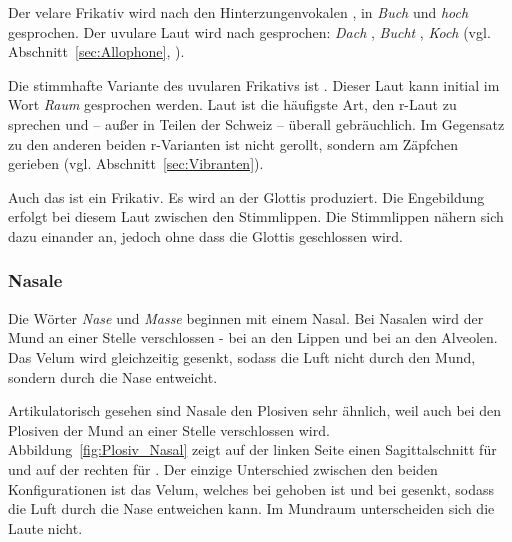 Der velare Frikativ \textipa{[x]} wird nach den Hinterzungenvokalen \textipa{[u, o]}, \zB in \textit{Buch} \textipa{[bu:x]} und \textit{hoch} \textipa{[ho:x]} gesprochen. Der uvulare Laut \textipa{[X]} wird nach \textipa{[a, U, O]} gesprochen: \textit{Dach} \textipa{[daX]}, \textit{Bucht} \textipa{[bUXt]}, \textit{Koch}  (vgl. Abschnitt~\ref{sec:Allophone}, \cite[202]{Pompino-Marschall2020}).

Die stimmhafte Variante des uvularen Frikativs \textipa{[X]} ist \textipa{[K]}. Dieser Laut kann initial im Wort \textit{Raum} \textipa{[K\t*{aU}m]} gesprochen werden. Laut \citet[52]{DudenAussprache2023} ist \textipa{[K]} die häufigste Art, den r-Laut zu sprechen und -- außer in Teilen der Schweiz -- überall gebräuchlich. Im Gegensatz zu den anderen beiden r-Varianten ist \textipa{[K]} nicht gerollt, sondern am Zäpfchen gerieben (vgl. Abschnitt~\ref{sec:Vibranten}).

Auch das \textipa{[h]} ist ein Frikativ. Es wird an der Glottis produziert. Die Engebildung erfolgt bei diesem Laut zwischen den Stimmlippen. Die Stimmlippen nähern sich dazu einander an, jedoch ohne dass die Glottis geschlossen wird.




\subsubsection{Nasale}\label{subsec:Nasale}

Die Wörter \textit{Nase} und \textit{Masse} beginnen mit einem Nasal. Bei Nasalen wird der Mund an einer Stelle verschlossen - bei \textipa{[m]} an den Lippen und bei \textipa{[n]} an den Alveolen. Das Velum wird gleichzeitig gesenkt, sodass die Luft nicht durch den Mund, sondern durch die Nase entweicht. 

Artikulatorisch gesehen sind Nasale den Plosiven sehr ähnlich, weil auch bei den Plosiven der Mund an einer Stelle verschlossen wird. Abbildung~\ref{fig:Plosiv_Nasal} zeigt auf der linken Seite einen Sagittalschnitt für \textipa{[p]} und auf der rechten für \textipa{[m]}. Der einzige Unterschied zwischen den beiden Konfigurationen ist das Velum, welches bei \textipa{[p]} gehoben ist und bei \textipa{[m]} gesenkt, sodass die Luft durch die Nase entweichen kann. Im Mundraum unterscheiden sich die Laute nicht.

